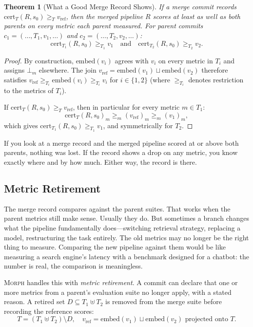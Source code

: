 \documentclass{article}
\newtheorem{theorem}{Theorem}
\begin{document}
\begin{theorem}[What a Good Merge Record Shows]
\label{thm:monotone}
If a merge commit records $\text{cert}_T(R, s_0) \geq_T v_{\text{ref}}$,
then the merged pipeline $R$ scores at least as well as both parents on every
metric each parent measured. For parent commits $c_1 = (\ldots, T_1, v_1, \ldots)$ and $c_2 =
(\ldots, T_2, v_2, \ldots)$:
\begin{equation}
  \text{cert}_{T_1}(R, s_0) \geq_{T_1} v_1 \quad \text{and} \quad
  \text{cert}_{T_2}(R, s_0) \geq_{T_2} v_2.
\end{equation}
\end{theorem}

\begin{proof}
By construction, $\text{embed}(v_i)$ agrees with $v_i$ on every metric in
$T_i$ and assigns $\bot_m$ elsewhere. The join $v_{\text{ref}} =
\text{embed}(v_1) \sqcup \text{embed}(v_2)$ therefore satisfies
$v_{\text{ref}} \geq_{T_i} \text{embed}(v_i) \geq_{T_i} v_i$ for $i \in
\{1, 2\}$ (where $\geq_{T_i}$ denotes restriction to the metrics of $T_i$).

If $\text{cert}_T(R, s_0) \geq_T v_{\text{ref}}$, then in particular for
every metric $m \in T_1$:
\[
  \text{cert}_T(R, s_0)_m \geq_m (v_{\text{ref}})_m \geq_m (v_1)_m,
\]
which gives $\text{cert}_{T_1}(R, s_0) \geq_{T_1} v_1$, and symmetrically
for $T_2$.
\end{proof}

If you look at a merge record and the merged pipeline scored at or above both
parents, nothing was lost. If the record shows a drop on any metric, you know
exactly where and by how much. Either way, the record is there.

\subsection{Metric Retirement}

The merge record compares against the parent suites. That works when the
parent metrics still make sense. Usually they do. But sometimes a branch
changes what the pipeline fundamentally does---switching retrieval strategy,
replacing a model, restructuring the task entirely. The old metrics may no
longer be the right thing to measure. Comparing the new pipeline against them
would be like measuring a search engine's latency with a benchmark designed for
a chatbot: the number is real, the comparison is meaningless.

\textsc{Morph} handles this with \emph{metric retirement}. A commit can declare that one or more metrics from a parent's evaluation suite
no longer apply, with a stated reason. A retired set $D \subseteq T_1 \uplus
T_2$ is removed from the merge suite before recording the reference scores:
\begin{equation}
  T = (T_1 \uplus T_2) \setminus D, \quad
  v_{\text{ref}} = \text{embed}(v_1) \sqcup \text{embed}(v_2)
    \text{ projected onto } T.
\end{equation}
\end{document}

